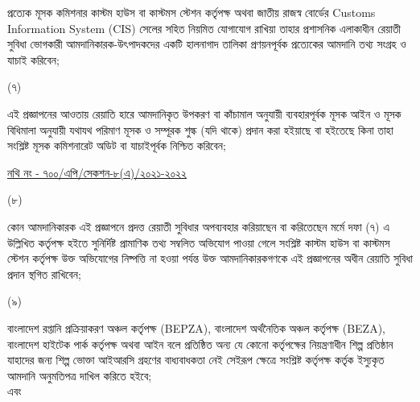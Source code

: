 \documentclass[12pt]{article}
\newcommand{\fileno}{নথি নং - ৭০০/এপি/সেকশন-৮(এ)/২০২১-২০২২}
\newcommand{\filenou}{
\begin{minipage}[t]{0.57\linewidth}
\hspace{1em}
\end{minipage}
\begin{minipage}[t]{0.43\linewidth}
\underline{\fileno}
\end{minipage}
}
\newcommand{\nfpage}{
\newpage
{\filenou}
}
\begin{document}
\begin{minipage}[t]{0.9\linewidth}
প্রত্যেক মূসক কমিশনার কাস্টম হাউস বা
কাস্টমস স্টেশন কর্তৃপক্ষ অথবা জাতীয় রাজস্ব বোর্ডের
Customs Information System (CIS)
সেলের সহিত নিয়মিত যোগাযোগ রাখিয়া তাহার
প্রশাসনিক এলাকাধীন রেয়াতী সুবিধা ভোগকারী
আমদানিকারক-উৎপাদকদের একটি হালনাগাদ তালিকা
প্রণয়নপূর্বক প্রত্যেকের আমদানি তথ্য সংগ্রহ ও যাচাই
করিবেন;
\end{minipage}
\begin{minipage}[t]{0.05\linewidth}
\hspace{1em}
\end{minipage}
\begin{minipage}[t]{0.05\linewidth}
(৭)
\end{minipage}
\begin{minipage}[t]{0.9\linewidth}
এই প্রজ্ঞাপনের আওতায় রেয়াতি হারে আমদানিকৃত
উপকরণ বা কাঁচামাল অনুযায়ী ব্যবহারপূর্বক মূসক
আইন ও মূসক বিধিমালা অনুযায়ী
যথাযথ পরিমাণ মূসক ও সম্পূরক শুল্ক (যদি থাকে) প্রদান
করা হইয়াছে বা হইতেছে কিনা তাহা সংশ্লিষ্ট মূসক
কমিশনারেট অডিট বা যাচাইপূর্বক নিশ্চিত করিবেন;
\end{minipage}
{\nfpage}
\begin{minipage}[t]{0.05\linewidth}\hspace{1em}
\end{minipage}
\begin{minipage}[t]{0.05\linewidth}
(৮)
\end{minipage}
\begin{minipage}[t]{0.9\linewidth}
কোন আমদানিকারক এই প্রজ্ঞাপনে প্রদত্ত রেয়াতী
সুবিধার অপব্যবহার করিয়াছেন বা করিতেছেন
মর্মে দফা (৭) এ উল্লিখিত কর্তৃপক্ষ হইতে সুনির্দিষ্ট
প্রামাণিক তথ্য সম্বলিত অভিযোগ পাওয়া গেলে সংশ্লিষ্ট
কাস্টম হাউস বা কাস্টমস স্টেশন কর্তৃপক্ষ উক্ত অভিযোগের
নিষ্পত্তি না হওয়া পর্যন্ত উক্ত আমদানিকারকগণকে
এই প্রজ্ঞাপনের অধীন রেয়াতি সুবিধা প্রদান স্থগিত রাখিবেন;
\\
\end{minipage}
\begin{minipage}[t]{0.05\linewidth}
\hspace{1em}
\end{minipage}
\begin{minipage}[t]{0.05\linewidth}
(৯)
\end{minipage}
\begin{minipage}[t]{0.9\linewidth}
বাংলাদেশ রপ্তানি প্রক্রিয়াকরণ অঞ্চল কর্তৃপক্ষ (BEPZA),
বাংলাদেশ অর্থনৈতিক অঞ্চল কর্তৃপক্ষ (BEZA),
বাংলাদেশ হাইটেক পার্ক কর্তৃপক্ষ অথবা আইন বলে প্রতিষ্ঠিত
অন্য যে কোনো কর্তৃপক্ষের নিয়ন্ত্রণাধীন শিল্প প্রতিষ্ঠান যাহাদের জন্য শিল্প ভোক্তা আইআরসি গ্রহণের বাধ্যবাধকতা নেই সেইরূপ
ক্ষেত্রে সংশ্লিষ্ট কর্তৃপক্ষ কর্তৃক ইস্যুকৃত আমদানি অনুমতিপত্র
দাখিল করিতে হইবে;
\\
এবং
\\
\end{minipage}
\end{document}
